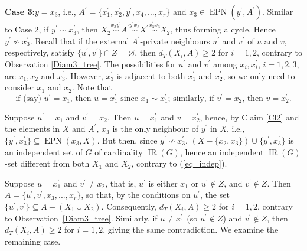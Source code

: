 \documentclass[12pt]{article}%
\begin{document}
\noindent\textbf{Case 3:\hspace{0.1in}}$y=x_{3}$, i.e., $A^{\prime}%
=\{x_{1}^{\prime},x_{2}^{\prime},y^{\prime},x_{4},\dots,x_{r}\}$ and $x_{3}%
\in\operatorname{EPN}(y^{\prime},A^{\prime})$. Similar to Case 2, if
$y^{\prime}\sim x_{3}^{\prime}$, then $X_{2}\overset{x_{3}y^{\prime}}{\sim
}A^{\prime}\overset{y^{\prime}x_{3}^{\prime}}{\sim}X^{\prime}\overset{x_{3}%
^{\prime}x_{3}}{\sim}X_{2}$, thus forming a cycle. Hence $y^{\prime}\nsim
x_{3}^{\prime}$. Recall that if the external $A^{\prime}$-private neighbours
$u^{\prime}$ and $v^{\prime}$ of $u$ and $v$, respectively, satisfy
$\{u^{\prime},v^{\prime}\}\cap Z=\varnothing$, then $d_{T}(X_{i},A)\geq2$ for
$i=1,2$, contrary to Observation \ref{Diam3_tree}. The possibilities for
$u^{\prime}$ and $v^{\prime}$ among $x_{i},x_{i}^{\prime}$, $i=1,2,3$, are
$x_{1},x_{2}$ and $x_{3}^{\prime}$. However, $x_{3}^{\prime}$ is adjacent to
both $x_{1}^{\prime}$ and $x_{2}^{\prime}$, so we only need to consider
$x_{1}$ and $x_{2}$. Note that
\begin{equation}
\text{if\ (say)\ }u^{\prime}=x_{1}\text{,\ then\ }u=x_{1}^{\prime
}\text{\ since\ }x_{1}\sim x_{1}^{\prime}\text{;\ similarly,\ if\ }v^{\prime
}=x_{2}\text{,\ then\ }v=x_{2}^{\prime}. \label{eq_case3a}%
\end{equation}


Suppose $u^{\prime}=x_{1}$ and $v^{\prime}=x_{2}$. Then $u=x_{1}^{\prime}$ and
$v=x_{2}^{\prime}$, hence, by Claim \ref{Cl2} and the elements in $X$ and
$A^{\prime}$, $x_{3}$ is the only neighbour of $y^{\prime}$ in $X$, i.e.,
$\{y^{\prime},x_{3}^{\prime}\}\subseteq\operatorname{EPN}(x_{3},X)$. But then,
since $y^{\prime}\nsim x_{3}^{\prime}$, $(X-\{x_{2},x_{3}\})\cup\{y^{\prime
},x_{3}^{\prime}\}$ is an independent set of $G$ of cardinality
$\operatorname{IR}(G)$, hence an independent $\operatorname{IR}(G)$-set
different from both $X_{1}$ and $X_{2}$, contrary to (\ref{eq_indep}).

Suppose $u=x_{1}^{\prime}$ and $v^{\prime}\neq x_{2}$, that is, $u^{\prime}$
is either $x_{1}$ or $u^{\prime}\notin Z$, and $v^{\prime}\notin Z$. Then
$A=\{u^{\prime},v^{\prime},x_{3},...,x_{r}\}$, so that, by the conditions on
$u^{\prime}$, the set $\{u^{\prime},v^{\prime}\}\subseteq A-(X_{1}\cup X_{2}%
)$. Consequently, $d_{T}(X_{i},A)\geq2$ for $i=1,2$, contrary to
Observation~\ref{Diam3_tree}. Similarly, if $u\neq x_{1}^{\prime}$ (so
$u^{\prime}\notin Z$) and $v^{\prime}\notin Z$, then $d_{T}(X_{i},A)\geq2$ for
$i=1,2$, giving the same contradiction. We examine the remaining case.
\end{document}
